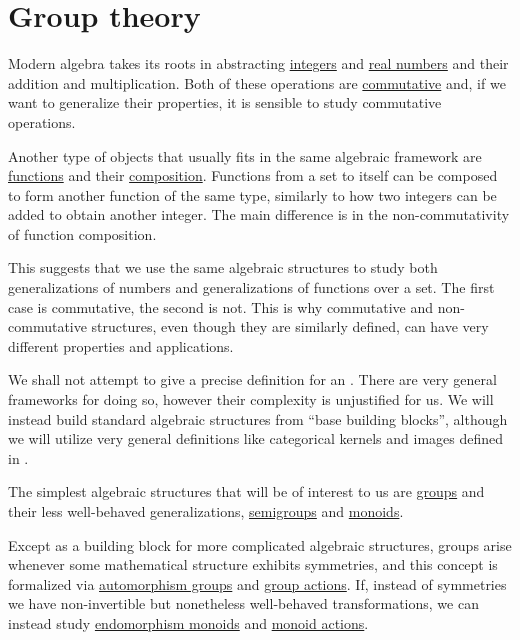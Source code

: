 \section{Group theory}\label{sec:group_theory}

Modern algebra takes its roots in abstracting \hyperref[def:set_of_integers]{integers} and \hyperref[def:set_of_real_numbers]{real numbers} and their addition and multiplication. Both of these operations are \hyperref[def:magma/commutative]{commutative} and, if we want to generalize their properties, it is sensible to study commutative operations.

Another type of objects that usually fits in the same algebraic framework are \hyperref[def:function]{functions} and their \hyperref[def:multi_valued_function/composition]{composition}. Functions from a set to itself can be composed to form another function of the same type, similarly to how two integers can be added to obtain another integer. The main difference is in the non-commutativity of function composition.

This suggests that we use the same algebraic structures to study both generalizations of numbers and generalizations of functions over a set. The first case is commutative, the second is not. This is why commutative and non-commutative structures, even though they are similarly defined, can have very different properties and applications.

We shall not attempt to give a precise definition for an . There are very general frameworks for doing so, however their complexity is unjustified for us. We will instead build standard algebraic structures from \enquote{base building blocks}, although we will utilize very general definitions like categorical kernels and images defined in .

The simplest algebraic structures that will be of interest to us are \hyperref[def:group]{groups} and their less well-behaved generalizations, \hyperref[def:magma/associative]{semigroups} and \hyperref[def:unital_magma/associative]{monoids}.

Except as a building block for more complicated algebraic structures, groups arise whenever some mathematical structure exhibits symmetries, and this concept is formalized via \hyperref[def:automorphism_group]{automorphism groups} and \hyperref[def:left_group_action]{group actions}. If, instead of symmetries we have non-invertible but nonetheless well-behaved transformations, we can instead study \hyperref[def:endomorphism_monoid]{endomorphism monoids} and \hyperref[def:left_monoid_action]{monoid actions}.
